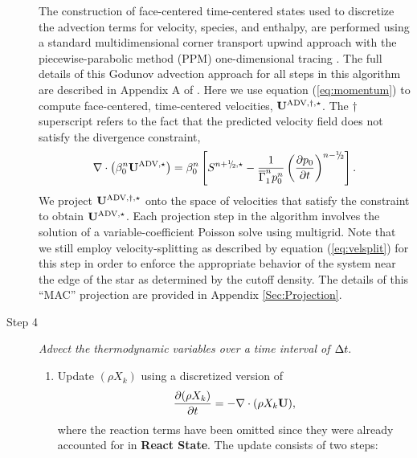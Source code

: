 \begin{description}
The construction of face-centered time-centered states used to discretize the
advection terms for velocity, species, and enthalpy, are performed using
a standard multidimensional corner transport upwind approach
\citep{colella1990multidimensional,saltzman1994unsplit} with the piecewise-parabolic method (PPM)
one-dimensional tracing \citep{colella1984piecewise}.  The full details of this
Godunov advection approach for all steps in this algorithm are described 
in Appendix A of \cite{XRB_III}.
Here we use equation (\ref{eq:momentum}) to compute face-centered, time-centered velocities, ${\bf{U}}^{\mathrm{ADV},\dagger,\star}$.
The $\dagger$ superscript refers to the fact that the predicted velocity field does not satisfy the divergence constraint,
\begin{equation}
\nabla \cdot \left(\beta_0^n \uadvone\right) = \beta_0^n \left[S^{\nph,\star} - \frac{1}{\gammaonebar^np_0^n}\left(\frac{\partial p_0}{\partial t}\right)^{n-\myhalf} \right].\label{eq:div1}
\end{equation}
 We project ${\bf{U}}^{\mathrm{ADV},\dagger,\star}$ onto the space of velocities that satisfy the constraint to obtain ${\bf{U}}^{\mathrm{ADV},\star}$.
Each projection step in the algorithm involves the solution of a variable-coefficient Poisson solve using multigrid.
Note that we still employ velocity-splitting as described by equation (\ref{eq:velsplit}) for this step 
in order to enforce the appropriate behavior of the system near the edge of the star as determined by the cutoff density.
The details of this ``MAC'' projection are provided in Appendix \ref{Sec:Projection}.

\item[Step 4] {\em Advect the thermodynamic variables over a time interval of $\Delta t.$}

\begin{enumerate}
\renewcommand{\theenumi}{{\bf \Alph{enumi}}}

\item Update $(\rho X_k)$ using a discretized version of
%
\begin{equation}
\frac{\partial(\rho X_k)}{\partial t} = -\nabla\cdot(\rho X_k\Ub),
\end{equation}
%
where the reaction terms have been omitted since they were already 
accounted for in {\bf React State}.  The update consists of two steps:

\begin{enumerate}
\renewcommand{\labelenumii}{{\bf \roman{enumii}}.}


\end{enumerate}
\end{enumerate}
\end{description}
